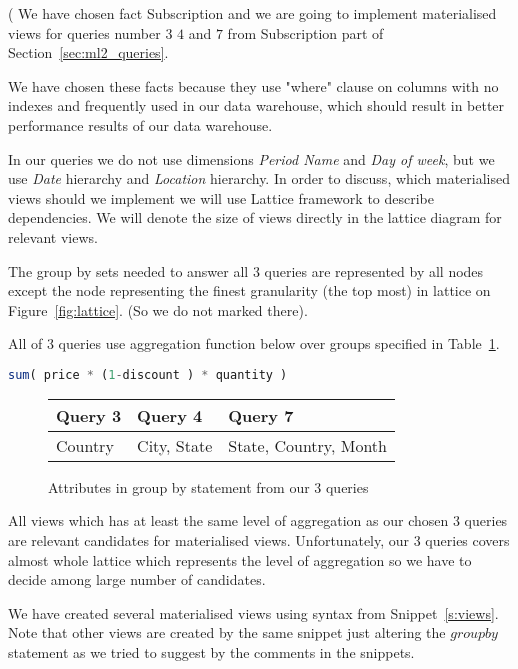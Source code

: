 (
We have chosen fact Subscription and we are going to 
implement materialised views for queries number $3$ $4$ and $7$ from Subscription part of Section~\ref{sec:ml2_queries}.
    
 We have chosen these facts because they use "where" clause on columns with no indexes 
 and frequently used in our data warehouse, which should result in better performance results
 of our data warehouse.

 In our queries we do not use dimensions {\it Period Name} and {\it Day of week}, but 
 we use {\it Date} hierarchy and {\it Location} hierarchy. 
 In order to discuss, which materialised views should we implement we will use Lattice framework to describe dependencies. We will denote the size of views directly in the lattice diagram for relevant views.

 The group by sets needed to answer all 3 queries are represented by all nodes except the node representing the finest granularity (the top most) in lattice on Figure~\ref{fig:lattice}. (So we do not marked there).

All of 3 queries use aggregation function below over groups specified in Table~\ref{t:groupby}.
\begin{lstlisting}[language=sql] 
sum( price * (1-discount ) * quantity )
\end{lstlisting}

\begin{figure}[!hbp]
\caption{\label{t:groupby}Attributes in group by statement from our 3 queries}
\begin{center}
\begin{tabular}{|p{3cm}|p{3cm}|p{5cm}|}
\hline
Query 3 & Query 4 & Query  7\\
\hline
\hline
Country & City, State  & State, Country, Month\\
\hline
\end{tabular}
\end{center}
\end{figure}

 All views which has at least the same level of aggregation as our chosen 3 queries are relevant candidates for materialised views. Unfortunately, our 3 queries covers almost whole lattice which represents the level of aggregation so we have to decide among large number of candidates.

We have created several materialised views using syntax from Snippet~\ref{s:views}.
Note that other views are created by the same snippet just altering the $group by$ statement
as we tried to suggest by the comments in the snippets.

